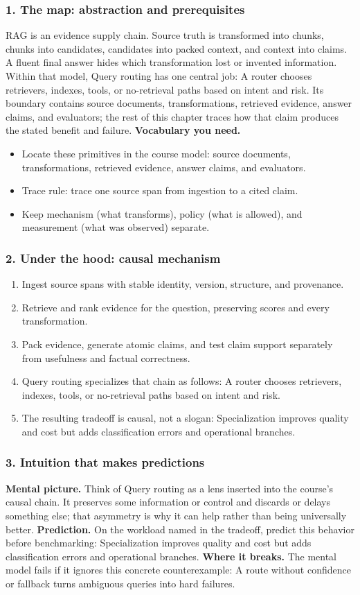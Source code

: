 \subsubsection*{1. The map: abstraction and prerequisites}
RAG is an evidence supply chain. Source truth is transformed into chunks, chunks into candidates, candidates into packed context, and context into claims. A fluent final answer hides which transformation lost or invented information.
Within that model, Query routing has one central job: A router chooses retrievers, indexes, tools, or no-retrieval paths based on intent and risk. Its boundary contains source documents, transformations, retrieved evidence, answer claims, and evaluators; the rest of this chapter traces how that claim produces the stated benefit and failure.
\textbf{Vocabulary you need.}\begin{itemize}
\item Locate these primitives in the course model: source documents, transformations, retrieved evidence, answer claims, and evaluators.
\item Trace rule: trace one source span from ingestion to a cited claim.
\item Keep mechanism (what transforms), policy (what is allowed), and measurement (what was observed) separate.
\end{itemize}
\subsubsection*{2. Under the hood: causal mechanism}\begin{enumerate}
\item Ingest source spans with stable identity, version, structure, and provenance.
\item Retrieve and rank evidence for the question, preserving scores and every transformation.
\item Pack evidence, generate atomic claims, and test claim support separately from usefulness and factual correctness.
\item Query routing specializes that chain as follows: A router chooses retrievers, indexes, tools, or no-retrieval paths based on intent and risk.
\item The resulting tradeoff is causal, not a slogan: Specialization improves quality and cost but adds classification errors and operational branches.
\end{enumerate}
\subsubsection*{3. Intuition that makes predictions}
\textbf{Mental picture.} Think of Query routing as a lens inserted into the course's causal chain. It preserves some information or control and discards or delays something else; that asymmetry is why it can help rather than being universally better.
\textbf{Prediction.} On the workload named in the tradeoff, predict this behavior before benchmarking: Specialization improves quality and cost but adds classification errors and operational branches.
\textbf{Where it breaks.} The mental model fails if it ignores this concrete counterexample: A route without confidence or fallback turns ambiguous queries into hard failures.

